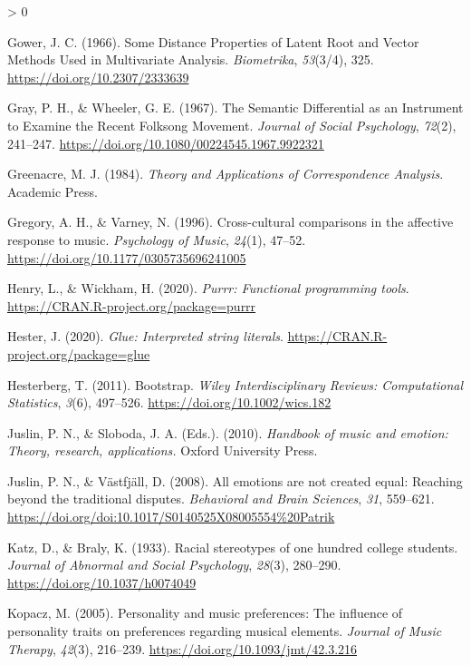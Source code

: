 \documentclass[
  english,
  man]{apa6}
\newlength{\cslhangindent}
\newenvironment{CSLReferences}[2] %
 {%
  \setlength{\parindent}{0pt}
  \ifodd #1 \everypar{\setlength{\hangindent}{\cslhangindent}}\ignorespaces\fi
  \ifnum #2 > 0
  \setlength{\parskip}{#2\baselineskip}
  \fi
 }%
 {}
\begin{document}
\begin{CSLReferences}{1}{0}
\leavevmode\hypertarget{ref-Gower1966}{}%
Gower, J. C. (1966). {Some Distance Properties of Latent Root and Vector Methods Used in Multivariate Analysis}. \emph{Biometrika}, \emph{53}(3/4), 325. \url{https://doi.org/10.2307/2333639}

\leavevmode\hypertarget{ref-Gray1967}{}%
Gray, P. H., \& Wheeler, G. E. (1967). {The Semantic Differential as an Instrument to Examine the Recent Folksong Movement}. \emph{Journal of Social Psychology}, \emph{72}(2), 241--247. \url{https://doi.org/10.1080/00224545.1967.9922321}

\leavevmode\hypertarget{ref-Greenacre1984}{}%
Greenacre, M. J. (1984). \emph{{Theory and Applications of Correspondence Analysis}}. Academic Press.

\leavevmode\hypertarget{ref-Gregory1996}{}%
Gregory, A. H., \& Varney, N. (1996). {Cross-cultural comparisons in the affective response to music}. \emph{Psychology of Music}, \emph{24}(1), 47--52. \url{https://doi.org/10.1177/0305735696241005}

\leavevmode\hypertarget{ref-R-purrr}{}%
Henry, L., \& Wickham, H. (2020). \emph{Purrr: Functional programming tools}. \url{https://CRAN.R-project.org/package=purrr}

\leavevmode\hypertarget{ref-R-glue}{}%
Hester, J. (2020). \emph{Glue: Interpreted string literals}. \url{https://CRAN.R-project.org/package=glue}

\leavevmode\hypertarget{ref-Hesterberg2011}{}%
Hesterberg, T. (2011). {Bootstrap}. \emph{Wiley Interdisciplinary Reviews: Computational Statistics}, \emph{3}(6), 497--526. \url{https://doi.org/10.1002/wics.182}

\leavevmode\hypertarget{ref-Juslin2010}{}%
Juslin, P. N., \& Sloboda, J. A. (Eds.). (2010). \emph{{Handbook of music and emotion: Theory, research, applications.}} Oxford University Press.

\leavevmode\hypertarget{ref-Juslin2008a}{}%
Juslin, P. N., \& Västfjäll, D. (2008). {All emotions are not created equal: Reaching beyond the traditional disputes}. \emph{Behavioral and Brain Sciences}, \emph{31}, 559--621. \url{https://doi.org/doi:10.1017/S0140525X08005554\%20Patrik}

\leavevmode\hypertarget{ref-Katz1933}{}%
Katz, D., \& Braly, K. (1933). {Racial stereotypes of one hundred college students}. \emph{Journal of Abnormal and Social Psychology}, \emph{28}(3), 280--290. \url{https://doi.org/10.1037/h0074049}

\leavevmode\hypertarget{ref-Kopacz2005}{}%
Kopacz, M. (2005). {Personality and music preferences: The influence of personality traits on preferences regarding musical elements}. \emph{Journal of Music Therapy}, \emph{42}(3), 216--239. \url{https://doi.org/10.1093/jmt/42.3.216}


\end{CSLReferences}
\end{document}
